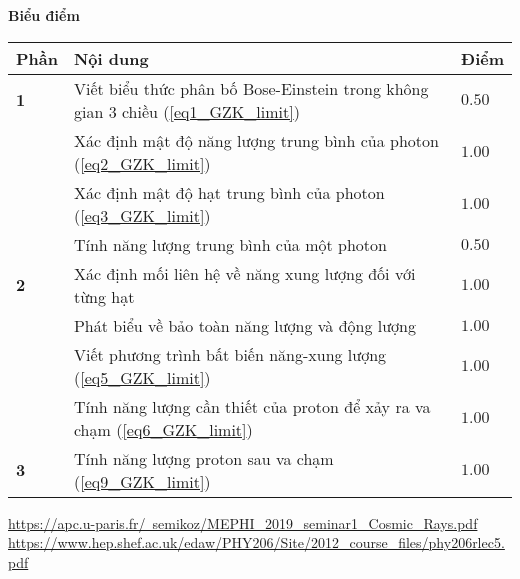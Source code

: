 \textbf{Biểu điểm}
\begin{center}
\begin{tabular}{|>{\centering\arraybackslash}m{1cm}|>{\raggedright\arraybackslash}m{14cm}| >{\centering\arraybackslash}m{1cm}|}
    \hline
    \textbf{Phần} & \textbf{Nội dung} & \textbf{Điểm} \\
    \hline
    \textbf{1} & Viết biểu thức phân bố Bose-Einstein trong không gian 3 chiều (\ref{eq1_GZK_limit}) & $0.50$ \\
    \cline{2-3}
    & Xác định mật độ năng lượng trung bình của photon (\ref{eq2_GZK_limit}) & $1.00$ \\
    \cline{2-3}
    & Xác định mật độ hạt trung bình của photon (\ref{eq3_GZK_limit}) & $1.00$ \\
    \cline{2-3}
    & Tính năng lượng trung bình của một photon & $0.50$ \\
    \hline
    \textbf{2} & Xác định mối liên hệ về năng xung lượng đối với từng hạt & $1.00$ \\
    \cline{2-3}
    & Phát biểu về bảo toàn năng lượng và động lượng & $1.00$ \\
    \cline{2-3}
    & Viết phương trình bất biến năng-xung lượng (\ref{eq5_GZK_limit}) & $1.00$ \\
    \cline{2-3}
    & Tính năng lượng cần thiết của proton để xảy ra va chạm (\ref{eq6_GZK_limit}) & $1.00$ \\
    \hline
    \textbf{3} & Tính năng lượng proton sau va chạm (\ref{eq9_GZK_limit}) & $1.00$ \\
    \hline
\end{tabular}
\end{center}


\begin{thebibliography}{}
 \href{https://apc.u-paris.fr/~semikoz/MEPHI_2019_seminar1_Cosmic_Rays.pdf}{https://apc.u-paris.fr/~semikoz/MEPHI\_2019\_seminar1\_Cosmic\_Rays.pdf}
 \href{https://www.hep.shef.ac.uk/edaw/PHY206/Site/2012_course_files/phy206rlec5.pdf}{https://www.hep.shef.ac.uk/edaw/PHY206/Site/2012\_course\_files/phy206rlec5.pdf}
\end{thebibliography}